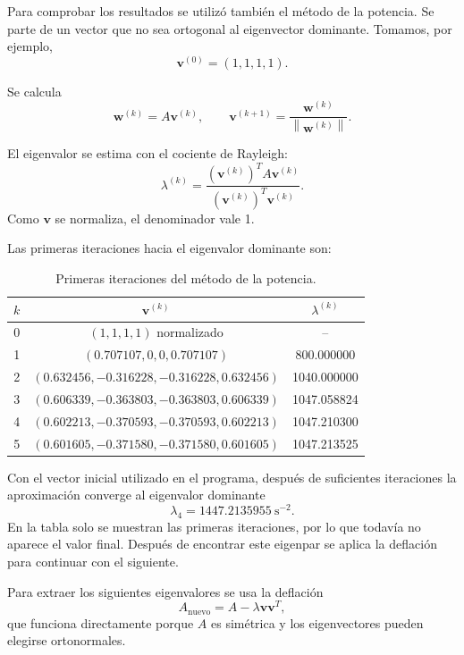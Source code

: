 \documentclass[11pt,a4paper]{article}
\newcommand{\norma}[1]{\left\lVert #1 \right\rVert}
\begin{document}
Para comprobar los resultados se utilizó también el método de la potencia. Se parte de un vector que no sea ortogonal al eigenvector dominante. Tomamos, por ejemplo,
\[
\mathbf v^{(0)}=(1,1,1,1).
\]

Se calcula
\begin{equation}
\mathbf w^{(k)}=A\mathbf v^{(k)},
\qquad
\mathbf v^{(k+1)}=\frac{\mathbf w^{(k)}}{\norma{\mathbf w^{(k)}}}.
\end{equation}

El eigenvalor se estima con el cociente de Rayleigh:
\begin{equation}
\lambda^{(k)}=\frac{(\mathbf v^{(k)})^TA\mathbf v^{(k)}}{(\mathbf v^{(k)})^T\mathbf v^{(k)}}.
\end{equation}
Como $\mathbf v$ se normaliza, el denominador vale 1.

Las primeras iteraciones hacia el eigenvalor dominante son:
\begin{table}[H]
\centering
\caption{Primeras iteraciones del método de la potencia.}
\begin{tabular}{c|c|c}
\toprule
$k$ & $\mathbf v^{(k)}$ & $\lambda^{(k)}$\\
\midrule
0&$(1,1,1,1)$ normalizado&--\\
1&$(0.707107,0,0,0.707107)$&800.000000\\
2&$(0.632456,-0.316228,-0.316228,0.632456)$&1040.000000\\
3&$(0.606339,-0.363803,-0.363803,0.606339)$&1047.058824\\
4&$(0.602213,-0.370593,-0.370593,0.602213)$&1047.210300\\
5&$(0.601605,-0.371580,-0.371580,0.601605)$&1047.213525\\
\bottomrule
\end{tabular}
\end{table}

Con el vector inicial utilizado en el programa, después de suficientes iteraciones la aproximación converge al eigenvalor dominante
\[
\lambda_4=1447.2135955\ \mathrm{s}^{-2}.
\]
En la tabla solo se muestran las primeras iteraciones, por lo que todavía no aparece el valor final. Después de encontrar este eigenpar se aplica la deflación para continuar con el siguiente.

Para extraer los siguientes eigenvalores se usa la deflación
\begin{equation}
\boxed{A_{\text{nuevo}}=A-\lambda\mathbf v\mathbf v^T},
\end{equation}
que funciona directamente porque $A$ es simétrica y los eigenvectores pueden elegirse ortonormales.
\end{document}
